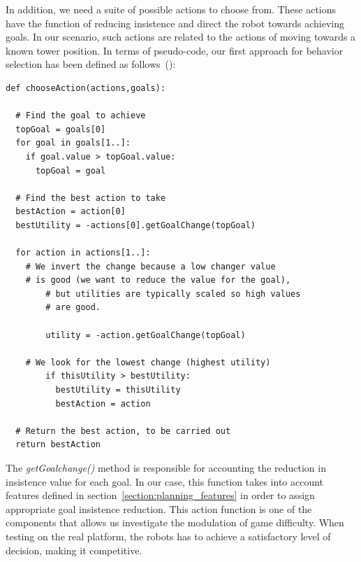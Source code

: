 In addition, we need a suite of possible actions to choose from. These actions have the function of reducing insistence and direct the robot towards achieving goals. In our scenario, such actions are related to the actions of moving towards a known tower position. In terms of pseudo-code, our first approach for behavior selection has been defined as follows~(\cite{millington_artificial_2009}):\\

\begin{lstlisting}[caption=A basic~\gls{gob} algorithm for action selection.]
def chooseAction(actions,goals):

  # Find the goal to achieve    
  topGoal = goals[0]
  for goal in goals[1..]:
    if goal.value > topGoal.value:
      topGoal = goal
    	
  # Find the best action to take
  bestAction = action[0]
  bestUtility = -actions[0].getGoalChange(topGoal)

  for action in actions[1..]:
    # We invert the change because a low changer value 
    # is good (we want to reduce the value for the goal),
    	# but utilities are typically scaled so high values 
    	# are good.
    		
    	utility = -action.getGoalChange(topGoal)
    		
    # We look for the lowest change (highest utility)
    	if thisUtility > bestUtility:
    	  bestUtility = thisUtility 
    	  bestAction = action
    			
  # Return the best action, to be carried out
  return bestAction
\end{lstlisting}\label{algorithm:planning}

The \textit{getGoalchange()} method is responsible for accounting the reduction in insistence value for each goal. In our case, this function takes into account features defined in section~\ref{section:planning_features} in order to assign appropriate goal insistence reduction. This action function is one of the  components that allows us investigate the modulation of game difficulty. When testing on the real platform, the robots has to achieve a satisfactory level of decision, making it competitive.

